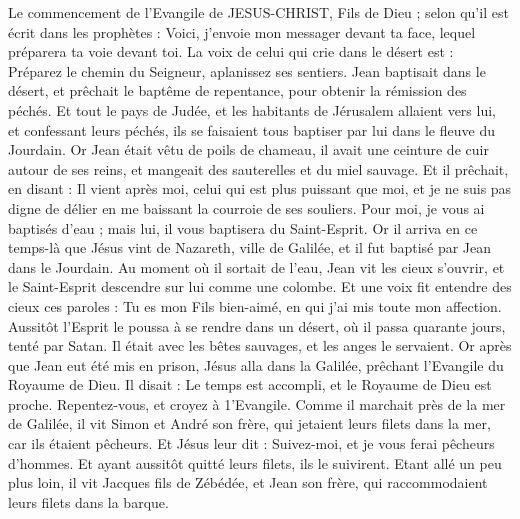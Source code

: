 \begin{multicols}{2}
\VerseOne{}Le commencement de l'Evangile de JESUS-CHRIST, Fils de Dieu ;
selon qu'il est écrit dans les prophètes : Voici, j'envoie mon messager devant ta face, lequel préparera ta voie devant toi.
La voix de celui qui crie dans le désert est : Préparez le chemin du Seigneur, aplanissez ses sentiers.
Jean baptisait dans le désert, et prêchait le baptême de repentance, pour obtenir la rémission des péchés.
Et tout le pays de Judée, et les habitants de Jérusalem allaient vers lui, et confessant leurs péchés, ils se faisaient tous baptiser par lui dans le fleuve du Jourdain.
Or Jean était vêtu de poils de chameau, il avait une ceinture de cuir autour de ses reins, et mangeait des sauterelles et du miel sauvage.
Et il prêchait, en disant : Il vient après moi, celui qui est plus puissant que moi, et je ne suis pas digne de délier en me baissant la courroie de ses souliers.
Pour moi, je vous ai baptisés d'eau ; mais lui, il vous baptisera du Saint-Esprit.
Or il arriva en ce temps-là que Jésus vint de Nazareth, ville de Galilée, et il fut baptisé par Jean dans le Jourdain.
Au moment où il sortait de l'eau, Jean vit les cieux s’ouvrir, et le Saint-Esprit descendre sur lui comme une colombe.
Et une voix fit entendre des cieux ces paroles : Tu es mon Fils bien-aimé, en qui j'ai mis toute mon affection.
Aussitôt l'Esprit le poussa à se rendre dans un désert,
où il passa quarante jours, tenté par Satan. Il était avec les bêtes sauvages, et les anges le servaient.
Or après que Jean eut été mis en prison, Jésus alla dans la Galilée, prêchant l'Evangile du Royaume de Dieu.
Il disait : Le temps est accompli, et le Royaume de Dieu est proche. Repentez-vous, et croyez à 1'Evangile.
Comme il marchait près de la mer de Galilée, il vit Simon et André son frère, qui jetaient leurs filets dans la mer, car ils étaient pêcheurs.
Et Jésus leur dit : Suivez-moi, et je vous ferai pêcheurs d'hommes.
Et ayant aussitôt quitté leurs filets, ils le suivirent.
Etant allé un peu plus loin, il vit Jacques fils de Zébédée, et Jean son frère, qui raccommodaient leurs filets dans la barque.

\end{multicols}
